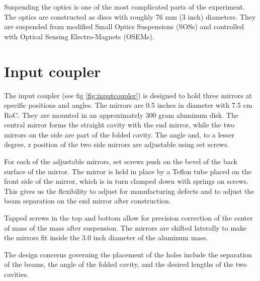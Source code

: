 Suspending the optics is one of the most complicated parts of the experiment.
The optics are constructed as discs with roughly 76 mm (3 inch) diameters. 
They are suspended from modified Small Optics Suspensions (SOSs) and controlled with Optical Sensing Electro-Magnets (OSEMs).

\section{Input coupler}

The input coupler (see fig \ref{fig:inputcoupler}) is designed to hold three mirrors at specific positions and angles. The mirrors are 0.5 inches in diameter with 7.5 cm RoC. They are mounted in an approximately 300 gram aluminum disk.
The central mirror forms the straight cavity with the end mirror, while the two mirrors on the side are part of the folded cavity. 
The angle and, to a lesser degree, z position of the two side mirrors are adjustable using set screws. 
 
For each of the adjustable mirrors, set screws push on the bevel of the back surface of the mirror. 
The mirror is held in place by a Teflon tube placed on the front side of the mirror, which is in turn clamped down with springs on screws.
This gives us the flexibility to adjust for manufacturing defects and to adjust the beam separation on the end mirror after construction.

Tapped screws in the top and bottom allow for precision correction of the center of mass of the mass after suspension.
The mirrors are shifted laterally to make the mirrors fit inside the 3.0 inch diameter of the aluminum mass.

The design concerns governing the placement of the holes include the separation of the beams, the angle of the folded cavity, and the desired lengths of the two cavities. 

